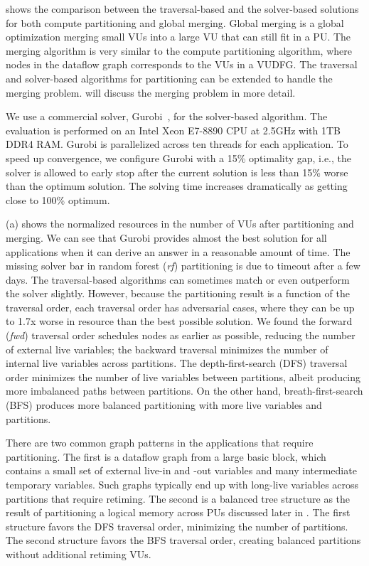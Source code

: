  shows the comparison between the traversal-based and the solver-based solutions for both
compute partitioning and global merging.
Global merging is a global optimization merging small VUs into a large VU that can still fit in
a PU. 
The merging algorithm is very similar to the compute partitioning algorithm, where nodes in the
dataflow graph corresponds to the VUs in a VUDFG. 
The traversal and solver-based algorithms for partitioning can be extended to handle the merging
problem.
 will discuss the merging problem in more detail.

We use a commercial solver, Gurobi~\cite{gurobi}, for the solver-based algorithm. 
The evaluation is performed on an Intel Xeon E7-8890 CPU at 2.5GHz with 1TB DDR4 RAM. 
Gurobi is parallelized across ten threads for each application.
To speed up convergence, we configure Gurobi with a 15\% optimality gap, i.e., 
the solver is allowed to early stop after the current solution is less than 15\% worse than the optimum
solution. 
The solving time increases dramatically as getting close to 100\% optimum.

 (a) shows the normalized resources in the number of VUs after partitioning and merging.
We can see that Gurobi provides almost the best solution for all applications when it can derive
an answer in a reasonable amount of time. The missing solver bar in random forest (\emph{rf}) partitioning
is due to timeout after a few days.
The traversal-based algorithms can sometimes match or even outperform the solver slightly.
However, because the partitioning result is a function of the traversal order, 
each traversal order has adversarial cases, where they can be up to 1.7x worse in resource than the best possible solution.
We found the forward (\emph{fwd}) traversal order schedules nodes as earlier as possible, reducing the number of
external live variables; the backward traversal minimizes the number of internal live variables
across partitions.
The depth-first-search (DFS) traversal order minimizes the number of live variables between partitions, 
albeit producing more imbalanced paths between partitions. 
On the other hand, breath-first-search (BFS) produces more balanced partitioning with more live variables and partitions.

There are two common graph patterns in the applications that require partitioning. 
The first is a dataflow graph from a large basic block, which contains a small set of external
live-in and -out variables and many intermediate temporary variables.
Such graphs typically end up with long-live variables across partitions that require retiming.
The second is a balanced tree structure as the result of partitioning
a logical memory across PUs discussed later in .
The first structure favors the DFS traversal order, minimizing the number of partitions. The second
structure favors the BFS traversal order, creating balanced partitions without additional
retiming VUs.

